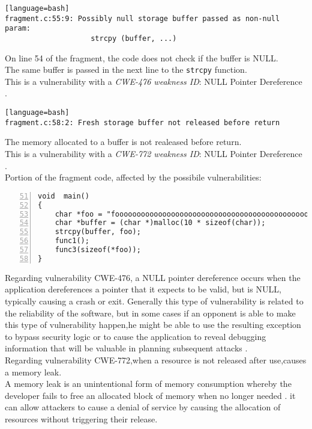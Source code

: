 \documentclass[a4paper,12pt]{article}
\begin{document}
\begin{lstlisting}[style=DOS][language=bash]
fragment.c:55:9: Possibly null storage buffer passed as non-null param:
                    strcpy (buffer, ...)
\end{lstlisting}
On line 54 of the fragment, the code does not check if the buffer is NULL.\\
The same buffer is passed in the next line to the \texttt{strcpy} function.\\
This is a vulnerability with a \textit{CWE-476 weakness ID}: NULL Pointer Dereference \cite{CWE476}.\\
\begin{lstlisting}[style=DOS][language=bash]
fragment.c:58:2: Fresh storage buffer not released before return
\end{lstlisting}
The memory allocated to a buffer is not  realeased before return.\\
This is a vulnerability with a \textit{CWE-772 weakness ID}: NULL Pointer Dereference \cite{CWE476}.\\
\newpage
Portion of the fragment code, affected by the possibile vulnerabilities:
\begin{lstlisting}[style=c,numbers=left,firstnumber=51,linebackgroundcolor={
\ifnum\value{lstnumber}=54\color{red}\fi
\ifnum\value{lstnumber}=55\color{red}\fi
\ifnum\value{lstnumber}=58\color{red}\fi
}]
void  main()
{
	char *foo = "fooooooooooooooooooooooooooooooooooooooooooooooooooo";
	char *buffer = (char *)malloc(10 * sizeof(char));
	strcpy(buffer, foo);
	func1();
	func3(sizeof(*foo));
}
\end{lstlisting}
Regarding vulnerability CWE-476, a NULL pointer dereference occurs when the application dereferences a pointer that it expects to be valid, but is NULL, typically causing a crash or exit.
Generally this type of vulnerability is related to the reliability of the software, but in some cases if an opponent is able to make this type of vulnerability happen,he might be able to use the resulting exception to bypass security logic or to cause the application to reveal debugging information that will be valuable in planning subsequent attacks \cite{nulldef}.\\
Regarding vulnerability CWE-772,when a resource is not released after use,causes a memory leak.\\
A memory leak is an unintentional form of memory consumption whereby the developer fails to free an allocated block of memory when no longer needed \cite{memoryleak}. it can allow attackers to cause a denial of service by causing the allocation of resources without triggering their release\cite{CWE772}.
\end{document}
